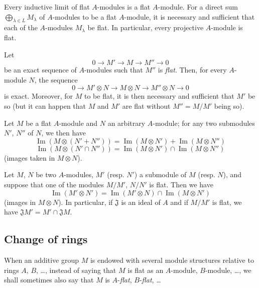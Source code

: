 \begin{env}[6.1.2]\label{0.6.1.2}
Every inductive limit of flat $A$-modules is a flat $A$-module. For
a direct sum $\bigoplus_{\lambda\in L}M_\lambda$ of $A$-modules to be
a flat $A$-module, it is necessary and sufficient that each of the $A$-modules
$M_\lambda$ be flat. In particular, every projective $A$-module is flat.

Let
\[
  0\longrightarrow M'\longrightarrow M\longrightarrow M''\longrightarrow 0
\]
be an exact sequence of $A$-modules such that $M''$ is \emph{flat}. Then, for
every $A$-module $N$, the sequence
\[
  0\longrightarrow M'\otimes N\longrightarrow M\otimes N
  \longrightarrow M''\otimes N\longrightarrow 0
\]
is exact. Moreover, for $M$ to be flat, it is then necessary and sufficient that
$M'$ be so (but it can happen that $M$ and $M'$ are flat without
$M''=M/M'$ being so).
\end{env}

\begin{env}[6.1.3]
\label{0.6.1.3}
Let $M$ be a flat $A$-module and $N$ an arbitrary $A$-module; for any two
submodules $N'$, $N''$ of $N$, we then have
\[
  \operatorname{Im}(M\otimes(N'+N''))
  =\operatorname{Im}(M\otimes N')+\operatorname{Im}(M\otimes N'')
\]
\[
  \operatorname{Im}(M\otimes(N'\cap N''))
  =\operatorname{Im}(M\otimes N')\cap\operatorname{Im}(M\otimes N'')
\]
(images taken in $M\otimes N$).
\end{env}

\begin{env}[6.1.4]
\label{0.6.1.4}
Let $M$, $N$ be two $A$-modules, $M'$ (resp. $N'$) a submodule of $M$
(resp. $N$), and suppose that one of the modules $M/M'$, $N/N'$ is flat.
Then we have
\[
  \operatorname{Im}(M'\otimes N')
  =\operatorname{Im}(M'\otimes N)\cap\operatorname{Im}(M\otimes N')
\]
(images in $M\otimes N$). In particular, if $\mathfrak{J}$ is an ideal
of $A$ and if $M/M'$ is flat, we have
$\mathfrak{J}M'=M'\cap\mathfrak{J}M$.
\end{env}

\subsection{Change of rings}
\label{subsection:0.6.2}

When an additive group $M$ is endowed with several module structures
relative to rings $A$, $B$, \ldots, instead of saying that $M$ is flat
as an $A$-module, $B$-module, \ldots, we shall sometimes also say that $M$
is $A$-\emph{flat}, $B$-\emph{flat}, \ldots

